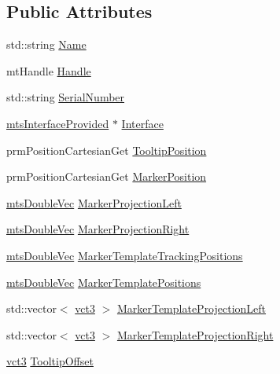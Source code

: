 \subsection*{Public Attributes}
\begin{DoxyCompactItemize}
\item 
std\+::string \hyperlink{classmts_micron_tracker_1_1_tool_a99366ed64e7a289aafe66e76b467614e}{Name}
\item 
mt\+Handle \hyperlink{classmts_micron_tracker_1_1_tool_ac1c53444059f0036ee818712b65cbff7}{Handle}
\item 
std\+::string \hyperlink{classmts_micron_tracker_1_1_tool_a474f21c01419e5afa938b1a6e0c27257}{Serial\+Number}
\item 
\hyperlink{classmts_interface_provided}{mts\+Interface\+Provided} $\ast$ \hyperlink{classmts_micron_tracker_1_1_tool_a883c18723a43e2096ccbaf852b3ee41c}{Interface}
\item 
prm\+Position\+Cartesian\+Get \hyperlink{classmts_micron_tracker_1_1_tool_a053af3e76832fc8cf0df4dc188e0ce8f}{Tooltip\+Position}
\item 
prm\+Position\+Cartesian\+Get \hyperlink{classmts_micron_tracker_1_1_tool_a2486620c5bf0ba342b737e5cccd4a154}{Marker\+Position}
\item 
\hyperlink{mts_vector_8h_af69167a5dc2ad33eb93965b9387d8403}{mts\+Double\+Vec} \hyperlink{classmts_micron_tracker_1_1_tool_a59cb72f20ac245239df66769dbbd9f00}{Marker\+Projection\+Left}
\item 
\hyperlink{mts_vector_8h_af69167a5dc2ad33eb93965b9387d8403}{mts\+Double\+Vec} \hyperlink{classmts_micron_tracker_1_1_tool_a217bdf4e30bcba4eff9e7c4b5cfd84cd}{Marker\+Projection\+Right}
\item 
\hyperlink{mts_vector_8h_af69167a5dc2ad33eb93965b9387d8403}{mts\+Double\+Vec} \hyperlink{classmts_micron_tracker_1_1_tool_ad134bdb9be08a36e4a6b27f495ca920c}{Marker\+Template\+Tracking\+Positions}
\item 
\hyperlink{mts_vector_8h_af69167a5dc2ad33eb93965b9387d8403}{mts\+Double\+Vec} \hyperlink{classmts_micron_tracker_1_1_tool_a1e2a36128f209ec70189e28502dbba67}{Marker\+Template\+Positions}
\item 
std\+::vector$<$ \hyperlink{vct_fixed_size_vector_types_8h_a3af82acdbf4eeb73c551909240b106ea}{vct3} $>$ \hyperlink{classmts_micron_tracker_1_1_tool_ad9b305c6ed8d81c2715cfdd7161ed146}{Marker\+Template\+Projection\+Left}
\item 
std\+::vector$<$ \hyperlink{vct_fixed_size_vector_types_8h_a3af82acdbf4eeb73c551909240b106ea}{vct3} $>$ \hyperlink{classmts_micron_tracker_1_1_tool_aa940a71dbf55cb85b2bf5681dd57c91e}{Marker\+Template\+Projection\+Right}
\item 
\hyperlink{vct_fixed_size_vector_types_8h_a3af82acdbf4eeb73c551909240b106ea}{vct3} \hyperlink{classmts_micron_tracker_1_1_tool_a661b9476c03d797ce5800bc887a35ceb}{Tooltip\+Offset}
\end{DoxyCompactItemize}



